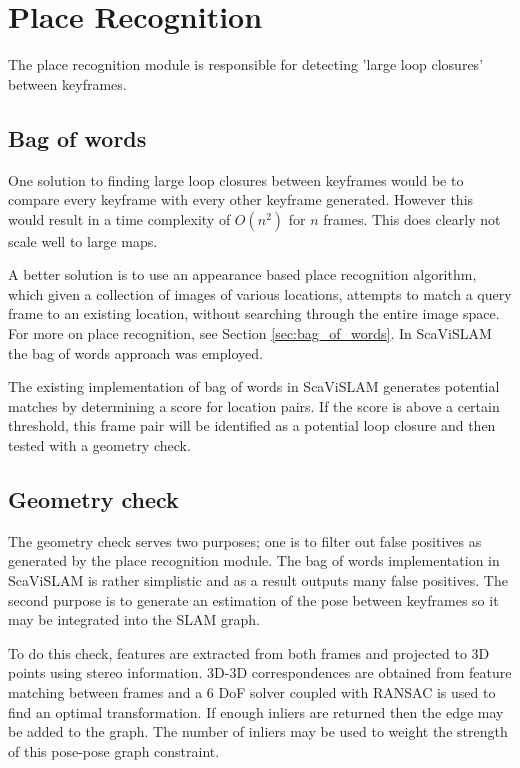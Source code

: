 \section{Place Recognition}
\label{sec:scavislam_place_recog}

The place recognition module is responsible for detecting 'large loop closures' between keyframes.

\subsection{Bag of words}

One solution to finding large loop closures between keyframes would be to compare every keyframe with every other keyframe generated.  However this would result in a time complexity of $O(n^2)$ for $n$ frames.  This does clearly not scale well to large maps.

A better solution is to use an appearance based place recognition algorithm, which given a collection of images of various locations, attempts to match a query frame to an existing location, without searching through the entire image space.  For more on place recognition, see Section \ref{sec:bag_of_words}.  In ScaViSLAM the bag of words approach was employed.


The existing implementation of bag of words in ScaViSLAM generates potential matches by determining a score for location pairs.  If the score is above a certain threshold, this frame pair will be identified as a potential loop closure and then tested with a geometry check.

\subsection{Geometry check}
\label{subsec:geometry_check}

The geometry check serves two purposes; one is to filter out false positives as generated by the place recognition module.  The bag of words implementation in ScaViSLAM is rather simplistic and as a result outputs many false positives.  The second purpose is to generate an estimation of the pose between keyframes so it may be integrated into the SLAM graph.  

To do this check, features are extracted from both frames and projected to 3D points using stereo information.  3D-3D correspondences are obtained from feature matching between frames and a 6 DoF solver coupled with RANSAC is used to find an optimal transformation.  If enough inliers are returned then the edge may be added to the graph.  The number of inliers may be used to weight the strength of this pose-pose graph constraint.

